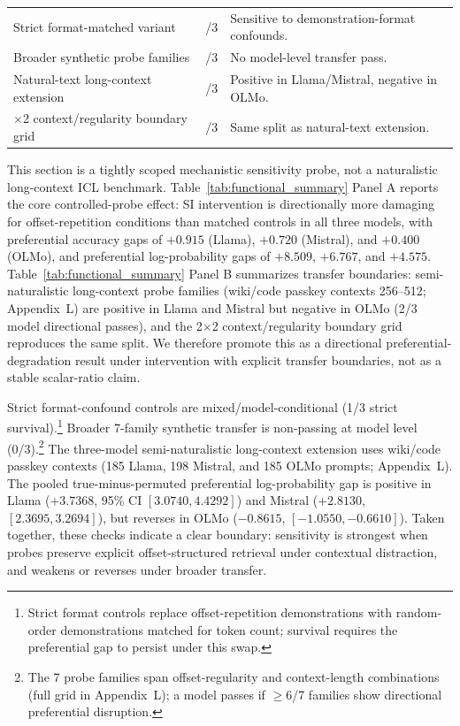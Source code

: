 \documentclass{article}
\begin{document}
\begin{table}[htbp]
\begin{minipage}{\columnwidth}
\begin{tabular}{@{}>{\raggedright\arraybackslash}p{2.8cm}>{\centering\arraybackslash}p{1.1cm}>{\raggedright\arraybackslash}p{3.7cm}@{}}
Strict format-matched variant & 1/3 & Sensitive to demonstration-format confounds. \\
Broader synthetic probe families & 0/3 & No model-level transfer pass. \\
Natural-text long-context extension & 2/3 & Positive in Llama/Mistral, negative in OLMo. \\
2$\times$2 context/regularity boundary grid & 2/3 & Same split as natural-text extension. \\
\bottomrule
\end{tabular}
\end{minipage}
\endgroup
\end{table}

This section is a tightly scoped mechanistic sensitivity probe, not a naturalistic long-context ICL benchmark. Table~\ref{tab:functional_summary} Panel A reports the core controlled-probe effect: SI intervention is directionally more damaging for offset-repetition conditions than matched controls in all three models, with preferential accuracy gaps of $+0.915$ (Llama), $+0.720$ (Mistral), and $+0.400$ (OLMo), and preferential log-probability gaps of $+8.509$, $+6.767$, and $+4.575$. Table~\ref{tab:functional_summary} Panel B summarizes transfer boundaries: semi-naturalistic long-context probe families (wiki/code passkey contexts 256--512; Appendix~L) are positive in Llama and Mistral but negative in OLMo (2/3 model directional passes), and the 2$\times$2 context/regularity boundary grid reproduces the same split. We therefore promote this as a directional preferential-degradation result under intervention with explicit transfer boundaries, not as a stable scalar-ratio claim.

Strict format-confound controls are mixed/model-conditional (1/3 strict survival).\footnote{Strict format controls replace offset-repetition demonstrations with random-order demonstrations matched for token count; survival requires the preferential gap to persist under this swap.} Broader 7-family synthetic transfer is non-passing at model level (0/3).\footnote{The 7 probe families span offset-regularity and context-length combinations (full grid in Appendix~L); a model passes if $\geq$6/7 families show directional preferential disruption.} The three-model semi-naturalistic long-context extension uses wiki/code passkey contexts (185 Llama, 198 Mistral, and 185 OLMo prompts; Appendix~L). The pooled true-minus-permuted preferential log-probability gap is positive in Llama ($+3.7368$, 95\% CI $[3.0740,4.4292]$) and Mistral ($+2.8130$, $[2.3695,3.2694]$), but reverses in OLMo ($-0.8615$, $[-1.0550,-0.6610]$). Taken together, these checks indicate a clear boundary: sensitivity is strongest when probes preserve explicit offset-structured retrieval under contextual distraction, and weakens or reverses under broader transfer.
\end{document}
